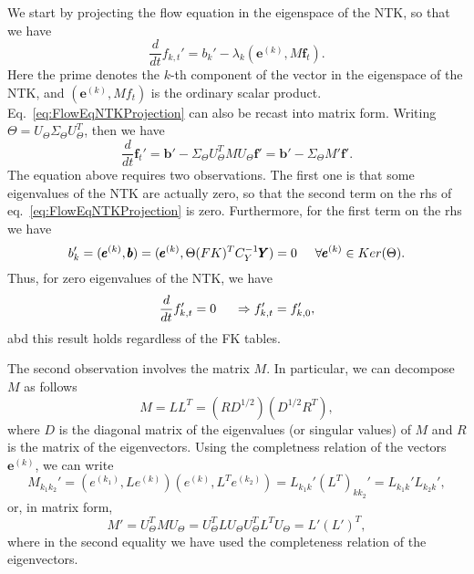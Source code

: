 \documentclass[11pt]{article}
\begin{document}
We start by projecting the flow equation in the eigenspace of the NTK, so that
we have
\begin{equation}
  \frac{d}{dt}f_{k,t}' = b_k' - \lambda_k (\pmb{e}^{(k)}, M \pmb{f}_t).
  \label{eq:FlowEqNTKProjection}
\end{equation}
Here the prime denotes the $k$-th component of the vector in the eigenspace of
the NTK, and $(\pmb{e}^{(k)}, M f_t)$ is the ordinary scalar product. Eq.~\eqref{eq:FlowEqNTKProjection}
can also be recast into matrix form. Writing $\Theta = U_{\Theta} \Sigma_{\Theta} U_{\Theta}^T$, then
we have
\begin{equation}
  \frac{d}{dt}\pmb{f}_{t}' = \pmb{b}' - \Sigma_{\Theta} U_{\Theta}^T M U_{\Theta} \pmb{f}'
  = \pmb{b}' - \Sigma_{\Theta} M' \pmb{f}'.
  \label{eq:FlowEqNTKProjectionMatrix}
\end{equation}
The equation above
requires two observations. The first one is that some eigenvalues of the NTK are
actually zero, so that the second term on the rhs of
eq.~\eqref{eq:FlowEqNTKProjection} is zero. Furthermore, for the first term on
the rhs we have
\begin{equation}
  b_k' = (\pmb{e}^{(k)}, \pmb{b}) = (\pmb{e}^{(k)}, \Theta (FK)^T C_Y^{-1} \pmb{Y}) = 0 \hspace{5mm} \forall \pmb{e}^{(k)} \in Ker(\Theta) .
\end{equation}
Thus, for zero eigenvalues of the NTK, we have
\begin{equation}
  \frac{d}{dt} f_{k,t}' = 0 \hspace{5mm} \Rightarrow f_{k,t}' = f_{k,0}' ,
\end{equation}
abd this result holds regardless of the FK tables.

The second observation involves the matrix $M$. In particular, we can decompose
$M$ as follows
\begin{equation}
  M = LL^T = (RD^{1/2})(D^{1/2}R^T),
\end{equation}
where $D$ is the diagonal matrix of the eigenvalues (or singular values) of $M$
and $R$ is the matrix of the eigenvectors. Using the completness relation of the
vectors $\pmb{e}^{(k)}$, we can write
\begin{equation}
  M_{k_1 k_2}' = (e^{(k_1)}, L e^{(k)})(e^{(k)}, L^T e^{(k_2)}) = L_{k_1k}' (L^T)_{kk_2}' = L_{k_1k}' L_{k_2k}',
  \label{eq:MProjNTK}
\end{equation}
or, in matrix form,
\begin{equation}
  M' = U_{\Theta}^T M U_{\Theta} = U_{\Theta}^T L U_{\Theta} U_{\Theta}^T L^T U_{\Theta} = L' (L')^T ,
  \label{eq:MProjNTKMatrix}
\end{equation}
where in the second equality we have used the completeness relation of the eigenvectors.
\end{document}
